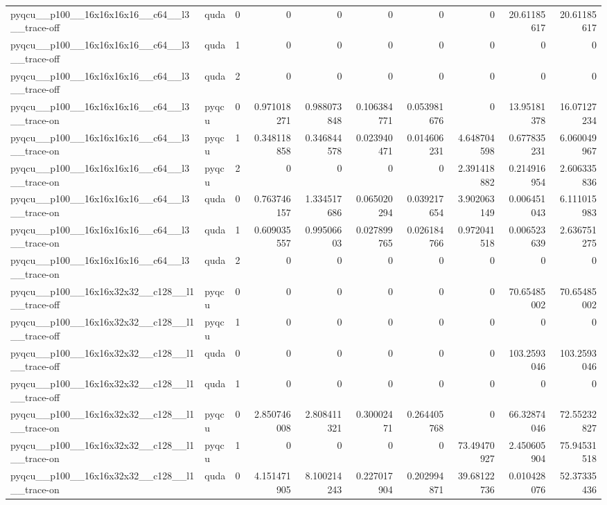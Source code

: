 \begin{table}[htbp]
\begin{tabular}{@{}llrrrrrrrr@{}}
pyqcu\_\_p100\_\_16x16x16x16\_\_c64\_\_l3\_\_trace-off & quda & 0 & 0 & 0 & 0 & 0 & 0 & 20.61185617 & 20.61185617 \\
pyqcu\_\_p100\_\_16x16x16x16\_\_c64\_\_l3\_\_trace-off & quda & 1 & 0 & 0 & 0 & 0 & 0 & 0 & 0 \\
pyqcu\_\_p100\_\_16x16x16x16\_\_c64\_\_l3\_\_trace-off & quda & 2 & 0 & 0 & 0 & 0 & 0 & 0 & 0 \\
pyqcu\_\_p100\_\_16x16x16x16\_\_c64\_\_l3\_\_trace-on & pyqcu & 0 & 0.971018271 & 0.988073848 & 0.106384771 & 0.053981676 & 0 & 13.95181378 & 16.07127234 \\
pyqcu\_\_p100\_\_16x16x16x16\_\_c64\_\_l3\_\_trace-on & pyqcu & 1 & 0.348118858 & 0.346844578 & 0.023940471 & 0.014606231 & 4.648704598 & 0.677835231 & 6.060049967 \\
pyqcu\_\_p100\_\_16x16x16x16\_\_c64\_\_l3\_\_trace-on & pyqcu & 2 & 0 & 0 & 0 & 0 & 2.391418882 & 0.214916954 & 2.606335836 \\
pyqcu\_\_p100\_\_16x16x16x16\_\_c64\_\_l3\_\_trace-on & quda & 0 & 0.763746157 & 1.334517686 & 0.065020294 & 0.039217654 & 3.902063149 & 0.006451043 & 6.111015983 \\
pyqcu\_\_p100\_\_16x16x16x16\_\_c64\_\_l3\_\_trace-on & quda & 1 & 0.609035557 & 0.99506603 & 0.027899765 & 0.026184766 & 0.972041518 & 0.006523639 & 2.636751275 \\
pyqcu\_\_p100\_\_16x16x16x16\_\_c64\_\_l3\_\_trace-on & quda & 2 & 0 & 0 & 0 & 0 & 0 & 0 & 0 \\
pyqcu\_\_p100\_\_16x16x32x32\_\_c128\_\_l1\_\_trace-off & pyqcu & 0 & 0 & 0 & 0 & 0 & 0 & 70.65485002 & 70.65485002 \\
pyqcu\_\_p100\_\_16x16x32x32\_\_c128\_\_l1\_\_trace-off & pyqcu & 1 & 0 & 0 & 0 & 0 & 0 & 0 & 0 \\
pyqcu\_\_p100\_\_16x16x32x32\_\_c128\_\_l1\_\_trace-off & quda & 0 & 0 & 0 & 0 & 0 & 0 & 103.2593046 & 103.2593046 \\
pyqcu\_\_p100\_\_16x16x32x32\_\_c128\_\_l1\_\_trace-off & quda & 1 & 0 & 0 & 0 & 0 & 0 & 0 & 0 \\
pyqcu\_\_p100\_\_16x16x32x32\_\_c128\_\_l1\_\_trace-on & pyqcu & 0 & 2.850746008 & 2.808411321 & 0.30002471 & 0.264405768 & 0 & 66.32874046 & 72.55232827 \\
pyqcu\_\_p100\_\_16x16x32x32\_\_c128\_\_l1\_\_trace-on & pyqcu & 1 & 0 & 0 & 0 & 0 & 73.49470927 & 2.450605904 & 75.94531518 \\
pyqcu\_\_p100\_\_16x16x32x32\_\_c128\_\_l1\_\_trace-on & quda & 0 & 4.151471905 & 8.100214243 & 0.227017904 & 0.202994871 & 39.68122736 & 0.010428076 & 52.37335436 \\

\end{tabular}
\end{table}
